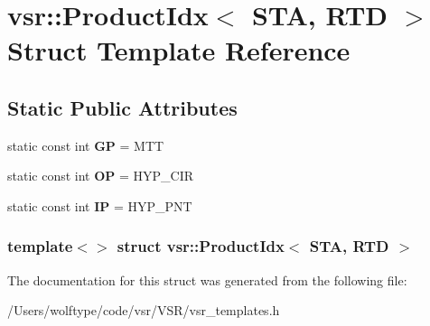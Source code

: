 \hypertarget{structvsr_1_1_product_idx_3_01_s_t_a_00_01_r_t_d_01_4}{\section{vsr\-:\-:Product\-Idx$<$ S\-T\-A, R\-T\-D $>$ Struct Template Reference}
\label{structvsr_1_1_product_idx_3_01_s_t_a_00_01_r_t_d_01_4}
}
\subsection*{Static Public Attributes}
\begin{DoxyCompactItemize}
\item 
\hypertarget{structvsr_1_1_product_idx_3_01_s_t_a_00_01_r_t_d_01_4_a649914dafce9bcfe823194aa3862b154}{static const int {\bfseries G\-P} = M\-T\-T}\label{structvsr_1_1_product_idx_3_01_s_t_a_00_01_r_t_d_01_4_a649914dafce9bcfe823194aa3862b154}

\item 
\hypertarget{structvsr_1_1_product_idx_3_01_s_t_a_00_01_r_t_d_01_4_a821aacb8722b9b488727442a86decf59}{static const int {\bfseries O\-P} = H\-Y\-P\-\_\-\-C\-I\-R}\label{structvsr_1_1_product_idx_3_01_s_t_a_00_01_r_t_d_01_4_a821aacb8722b9b488727442a86decf59}

\item 
\hypertarget{structvsr_1_1_product_idx_3_01_s_t_a_00_01_r_t_d_01_4_a986bbc38dc6cac86d89c99364c893ad2}{static const int {\bfseries I\-P} = H\-Y\-P\-\_\-\-P\-N\-T}\label{structvsr_1_1_product_idx_3_01_s_t_a_00_01_r_t_d_01_4_a986bbc38dc6cac86d89c99364c893ad2}

\end{DoxyCompactItemize}
\subsubsection*{template$<$$>$ struct vsr\-::\-Product\-Idx$<$ S\-T\-A, R\-T\-D $>$}



The documentation for this struct was generated from the following file\-:\begin{DoxyCompactItemize}
\item 
/\-Users/wolftype/code/vsr/\-V\-S\-R/vsr\-\_\-templates.\-h\end{DoxyCompactItemize}
